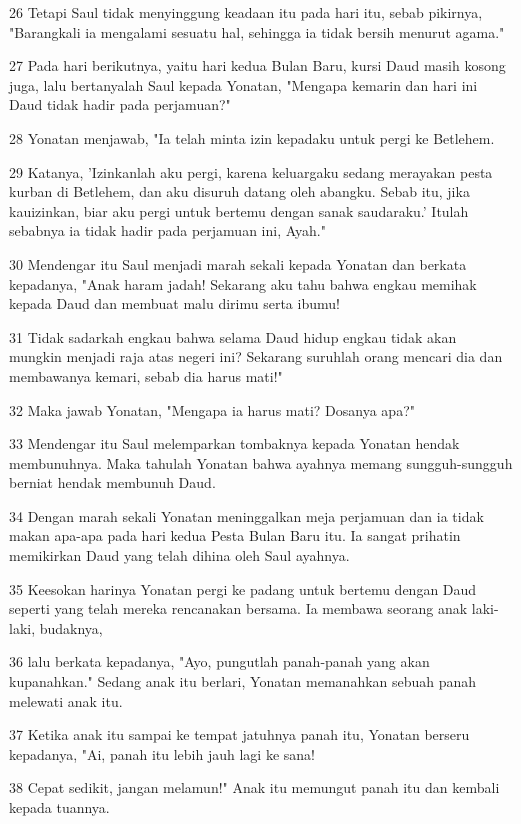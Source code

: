 \par 26 Tetapi Saul tidak menyinggung keadaan itu pada hari itu, sebab pikirnya, "Barangkali ia mengalami sesuatu hal, sehingga ia tidak bersih menurut agama."
\par 27 Pada hari berikutnya, yaitu hari kedua Bulan Baru, kursi Daud masih kosong juga, lalu bertanyalah Saul kepada Yonatan, "Mengapa kemarin dan hari ini Daud tidak hadir pada perjamuan?"
\par 28 Yonatan menjawab, "Ia telah minta izin kepadaku untuk pergi ke Betlehem.
\par 29 Katanya, 'Izinkanlah aku pergi, karena keluargaku sedang merayakan pesta kurban di Betlehem, dan aku disuruh datang oleh abangku. Sebab itu, jika kauizinkan, biar aku pergi untuk bertemu dengan sanak saudaraku.' Itulah sebabnya ia tidak hadir pada perjamuan ini, Ayah."
\par 30 Mendengar itu Saul menjadi marah sekali kepada Yonatan dan berkata kepadanya, "Anak haram jadah! Sekarang aku tahu bahwa engkau memihak kepada Daud dan membuat malu dirimu serta ibumu!
\par 31 Tidak sadarkah engkau bahwa selama Daud hidup engkau tidak akan mungkin menjadi raja atas negeri ini? Sekarang suruhlah orang mencari dia dan membawanya kemari, sebab dia harus mati!"
\par 32 Maka jawab Yonatan, "Mengapa ia harus mati? Dosanya apa?"
\par 33 Mendengar itu Saul melemparkan tombaknya kepada Yonatan hendak membunuhnya. Maka tahulah Yonatan bahwa ayahnya memang sungguh-sungguh berniat hendak membunuh Daud.
\par 34 Dengan marah sekali Yonatan meninggalkan meja perjamuan dan ia tidak makan apa-apa pada hari kedua Pesta Bulan Baru itu. Ia sangat prihatin memikirkan Daud yang telah dihina oleh Saul ayahnya.
\par 35 Keesokan harinya Yonatan pergi ke padang untuk bertemu dengan Daud seperti yang telah mereka rencanakan bersama. Ia membawa seorang anak laki-laki, budaknya,
\par 36 lalu berkata kepadanya, "Ayo, pungutlah panah-panah yang akan kupanahkan." Sedang anak itu berlari, Yonatan memanahkan sebuah panah melewati anak itu.
\par 37 Ketika anak itu sampai ke tempat jatuhnya panah itu, Yonatan berseru kepadanya, "Ai, panah itu lebih jauh lagi ke sana!
\par 38 Cepat sedikit, jangan melamun!" Anak itu memungut panah itu dan kembali kepada tuannya.
